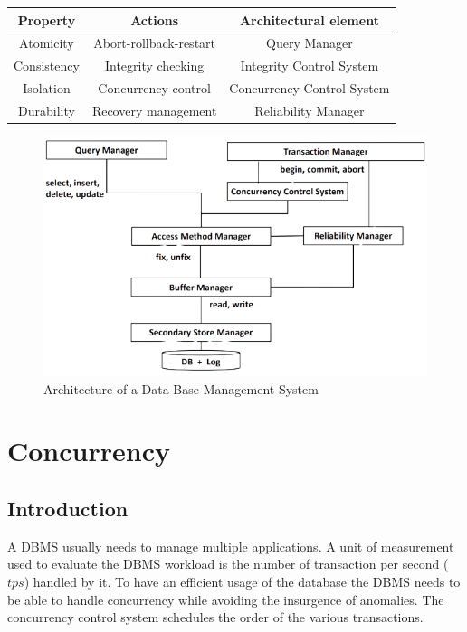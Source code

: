 \documentclass[12pt, a4paper]{report}
\begin{document}
    \begin{table}[H]
        \centering
        \begin{tabular}{c|c|c}
        \textbf{Property} & \textbf{Actions}       & \textbf{Architectural element} \\ \hline
        Atomicity         & Abort-rollback-restart & Query Manager                  \\
        Consistency       & Integrity checking     & Integrity Control System       \\
        Isolation         & Concurrency control    & Concurrency Control System     \\
        Durability        & Recovery management    & Reliability Manager           
        \end{tabular}
    \end{table}
    \begin{figure}[H]
        \centering
        \includegraphics[width=0.75\linewidth]{images/architecture.png}
        \caption{Architecture of a Data Base Management System}
    \end{figure}

\newpage

\chapter{Concurrency}
    \section{Introduction}
    A DBMS usually needs to manage multiple applications. A unit of measurement used to evaluate the DBMS workload is the number of transaction per second ($tps$) handled by it. 
    To have an efficient usage of the database the DBMS needs to be able to handle concurrency while avoiding the insurgence of anomalies. 
    The concurrency control system schedules the order of the various transactions. 
    
\end{document}
